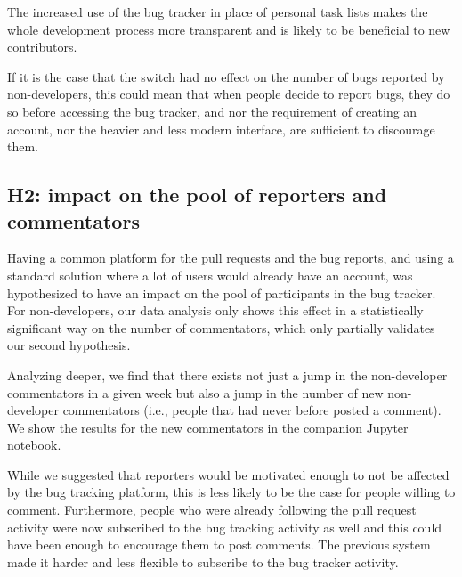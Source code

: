 \documentclass[conference]{IEEEtran}
\begin{document}
The increased use of the bug tracker in place of personal task lists makes the whole development process more transparent and is likely to be beneficial to new contributors.

If it is the case that the switch had no effect on the number of bugs reported by non-developers, this could mean that when people decide to report bugs, they do so before accessing the bug tracker, and nor the requirement of creating an account, nor the heavier and less modern interface, are sufficient to discourage them.


\subsection{H2: impact on the pool of reporters and commentators}


Having a common platform for the pull requests and the bug reports, and using a standard solution where a lot of users would already have an account, was hypothesized to have an impact on the pool of participants in the bug tracker. For non-developers, our data analysis only shows this effect in a statistically significant way on the number of commentators, which only partially validates our second hypothesis.

Analyzing deeper, we find that there exists not just a jump in the non-developer commentators in a given week but also a jump in the number of new non-developer commentators (i.e., people that had never before posted a comment). We show the results for the new commentators in the companion Jupyter notebook.

While we suggested that reporters would be motivated enough to not be affected by the bug tracking platform, this is less likely to be the case for people willing to comment. Furthermore, people who were already following the pull request activity were now subscribed to the bug tracking activity as well and this could have been enough to encourage them to post comments. The previous system made it harder and less flexible to subscribe to the bug tracker activity.
\end{document}
